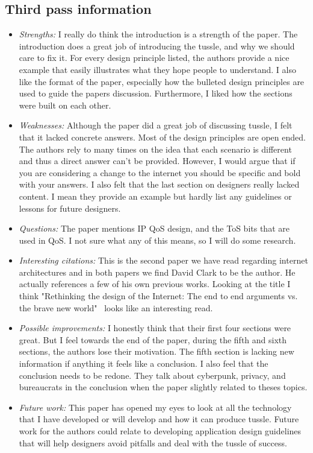 \documentclass[letterpaper,twocolumn,10pt]{article}
\begin{document}
\subsection{Third pass information}
\label{sec:third}
\begin{itemize}

\item {\it Strengths:} 
I really do think the introduction is a strength of the paper. The introduction does a great job of introducing
the tussle, and why we should care to fix it. For every design principle listed, the authors provide a nice 
example that easily illustrates what they hope people to understand. I also like the format of the paper,
especially how the bulleted design principles are used to guide the papers discussion. Furthermore, I liked 
how the sections were built on each other.  

\item {\it Weaknesses:}
Although the paper did a great job of discussing tussle, I felt that it lacked concrete answers. Most of the 
design principles are open ended. The authors rely to many times on the idea that each scenario 
is different and thus a direct answer can't be provided. However, I would argue that if you are considering 
a change to the internet you should be specific and bold with your answers. I also felt that the last section
on designers really lacked content. I mean they provide an example but hardly list any guidelines or lessons
for future designers.    

\item {\it Questions:} 
The paper mentions IP QoS design, and the ToS bits that are used in QoS. I not sure what any of this means,
so I will do some research. 

\item {\it Interesting citations:} 
This is the second paper we have read regarding internet architectures and in both papers we find David Clark 
to be the author. He actually references a few of his own previous works. Looking at the title I think "Rethinking the 
design of the Internet: The end to end arguments vs. the brave new world"~\cite{newworld} looks like an interesting 
read.

\item {\it Possible improvements:} 
I honestly think that their first four sections were great. But I feel towards the end of the paper, during the fifth
and sixth sections, the authors lose their motivation. The fifth section is lacking new information if anything it feels
like a conclusion. I also feel that the conclusion needs to be redone. They talk about cyberpunk, privacy,
and bureaucrats in the conclusion when the paper slightly related to theses topics.

\item {\it Future work:} 
This paper has opened my eyes to look at all the technology that I have developed or will develop and how it 
can produce tussle. Future work for the authors could relate to developing application design guidelines that
will help designers avoid pitfalls and deal with the tussle of success.

\end{itemize}

{
  \small 
  
  
}
\end{document}
